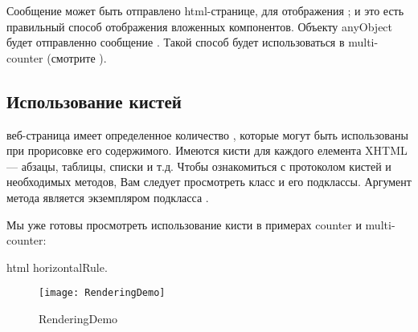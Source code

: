 \documentclass[a4paper,10pt,twoside]{book}
\begin{document}
Сообщение  может быть отправлено html-странице,
для отображения ;
и это есть правильный способ отображения вложенных компонентов.
Объекту anyObject будет отправленно сообщение .
Такой способ будет использоваться в multi-counter
(смотрите ).


\subsection{Использование кистей}


веб-страница имеет определенное количество ,
которые могут быть использованы при прорисовке его содержимого.
Имеются кисти для каждого елемента XHTML --- абзацы, таблицы, списки и т.д.
Чтобы ознакомиться с  протоколом кистей и необходимых методов,
Вам следует просмотреть класс  и его подклассы.
Аргумент метода 
является экземпляром подкласса .


Мы уже готовы просмотреть использование кисти в примерах counter и multi-counter:
\begin{code}{}
html horizontalRule.
\end{code}

\begin{figure}[ht]
\begin{center}
\texttt{[image: RenderingDemo]}
\caption{RenderingDemo}
\end{center}
\end{figure}
\end{document}

